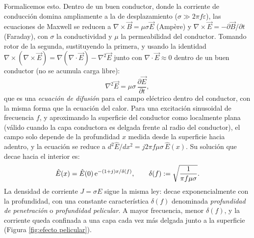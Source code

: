 Formalicemos esto. Dentro de un buen conductor, donde la corriente de conducción domina ampliamente a la de desplazamiento ($\sigma\gg 2\pi f\varepsilon$), las ecuaciones de Maxwell se reducen a $\nabla\times \vec B = \mu\sigma \vec E$ (Ampère) y $\nabla\times \vec E = -\partial \vec B/\partial t$ (Faraday), con $\sigma$ la conductividad y $\mu$ la permeabilidad del conductor. Tomando rotor de la segunda, sustituyendo la primera, y usando la identidad $\nabla\times(\nabla\times\vec E)=\nabla(\nabla\cdot\vec E)-\nabla^2\vec E$ junto con $\nabla\cdot \vec E\approx 0$ dentro de un buen conductor (no se acumula carga libre):
\begin{equation*}
    \nabla^2 \vec E = \mu\sigma\, \frac{\partial \vec E}{\partial t},
\end{equation*}
que es una \emph{ecuación de difusión} para el campo eléctrico dentro del conductor, con la misma forma que la ecuación del calor. Para una excitación sinusoidal de frecuencia $f$, y aproximando la superficie del conductor como localmente plana (válido cuando la capa conductora es delgada frente al radio del conductor), el campo solo depende de la profundidad $x$ medida desde la superficie hacia adentro, y la ecuación se reduce a $d^2\hat E/dx^2 = j2\pi f \mu\sigma\, \hat E(x)$. Su solución que decae hacia el interior es:
\begin{equation}\label{eq:campo skin}
    \hat E(x) = \hat E(0)\, \mathrm{e}^{-(1+j)x/\delta(f)}, \qquad \delta(f) := \sqrt{\frac{1}{\pi f \mu\sigma}}.
\end{equation}
La densidad de corriente $J=\sigma E$ sigue la misma ley: decae exponencialmente con la profundidad, con una constante característica $\delta(f)$ denominada \emph{profundidad de penetración} o \emph{profundidad pelicular}. A mayor frecuencia, menor $\delta(f)$, y la corriente queda confinada a una capa cada vez más delgada junto a la superficie (Figura \ref{fig:efecto pelicular}).

